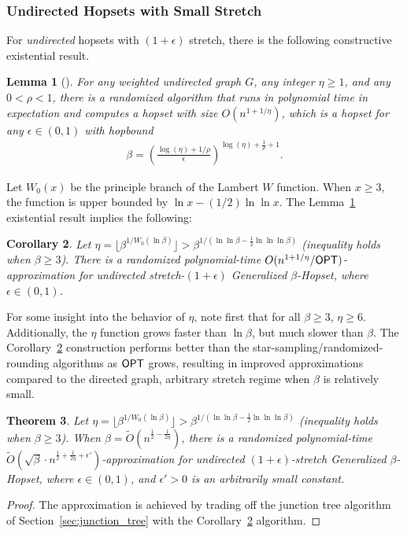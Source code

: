 \documentclass{article}
\newtheorem{theorem}{Theorem}[section]
\newtheorem{corollary}[theorem]{Corollary}
\newtheorem{lemma}[theorem]{Lemma}
\theoremstyle{definition}
\theoremstyle{remark}
\def\be    {\beta}
\def\opt {{\sf OPT}}
\def\hopset {{\sc Generalized $\beta$-Hopset}}
\begin{document}
\subsubsection{Undirected Hopsets with Small Stretch}
For \textit{undirected} hopsets with $(1+\epsilon)$ stretch, there is the following constructive existential result.

\begin{lemma}[\hspace{1sp}\cite{elkin2019RNC}] \label{lem:existential_undir_eps}
    For any weighted undirected graph $G$, any integer $\eta \geq 1$, and any $0 < \rho < 1$, there is a randomized algorithm that runs in polynomial time in expectation and computes a hopset with size $O(n^{1 + 1/\eta})$, which is a hopset for any $\epsilon \in (0,1)$ with hopbound
    \begin{align*}
        \beta = \left( \frac{\log(\eta) + 1/\rho }{\epsilon}   \right)^{\log(\eta) + \frac{1}{\rho}+1} .
    \end{align*}
\end{lemma}

Let $W_0(x)$ be the principle branch of the Lambert $W$ function. When $x \geq 3$, the function is upper bounded by $\ln{x} - (1/2) \ln{\ln{x}}$. The Lemma~\ref{lem:existential_undir_eps} existential result implies the following:

\begin{corollary} \label{cor:existential_undir_eps}
    Let $\eta = \lfloor \beta^{1/W_0(\ln{\beta})} \rfloor > \be^{1/(\ln{\ln{\be}}-\frac{1}{2}\ln{\ln{\ln{\be}}})}$ (inequality holds when $\be \geq 3$). There is a randomized polynomial-time $O(n^{1 + 1/\eta} / {\opt})$-approximation for undirected stretch-$(1+\epsilon)$ {\hopset}, where $\epsilon \in (0,1)$.
\end{corollary}

For some insight into the behavior of $\eta$, note first that for all $\beta \geq 3$, $\eta \geq 6$. Additionally, the $\eta$ function grows faster than $\ln{\be}$, but much slower than $\be$. The Corollary~\ref{cor:existential_undir_eps} construction performs better than the star-sampling/randomized-rounding algorithms as $\opt$ grows, resulting in improved approximations compared to the directed graph, arbitrary stretch regime when $\be$ is relatively small. 


\begin{theorem} \label{thm:undir_eps}    
    Let $\eta = \lfloor \beta^{1/W_0(\ln{\beta})} \rfloor > \be^{1/(\ln{\ln{\be}}-\frac{1}{2}\ln{\ln{\ln{\be}}})}$ (inequality holds when $\be \geq 3$). When $\beta = \widetilde{O}(n^{\frac{1}{2} - \frac{1}{2\eta}})$, there is a randomized polynomial-time $\widetilde{O}(\sqrt{\be} \cdot n^{\frac{1}{2} + \frac{1}{2\eta} + \epsilon'})$-approximation for undirected $(1+\epsilon)$-stretch {\hopset}, where $\epsilon \in (0,1)$, and $\epsilon' > 0$ is an arbitrarily small constant.
\end{theorem}
\begin{proof}
    The approximation is achieved by trading off the junction tree algorithm of Section~\ref{sec:junction_tree} with the Corollary~\ref{cor:existential_undir_eps} algorithm.
\end{proof}
\end{document}
